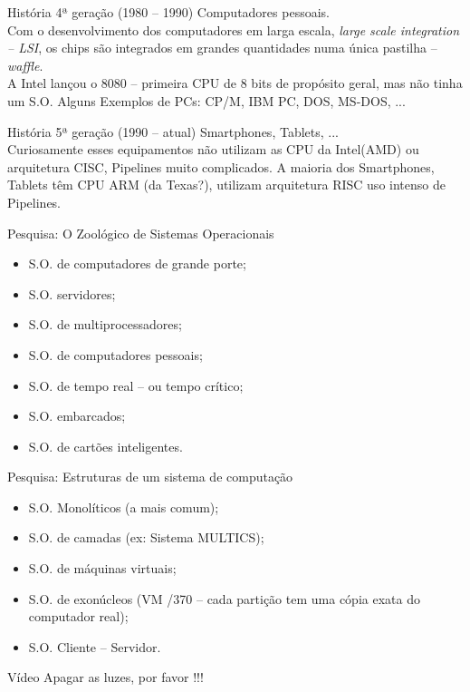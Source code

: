 \documentclass[11pt]{beamer}
\begin{document}

\begin{frame}{História}
  4ª geração (1980 -- 1990) Computadores pessoais.\\
  \vspace{0.2in}
  Com o desenvolvimento dos computadores em larga escala, \textit{large scale integration -- LSI}, os chips são integrados em grandes quantidades
  numa única pastilha -- \textit{waffle}.\\
  A Intel lançou o 8080 -- primeira CPU de 8 bits de propósito geral, mas não tinha um S.O.
  Alguns Exemplos de PCs: CP/M, IBM PC, DOS, MS-DOS, ...
  
\end{frame}



\begin{frame}{História}
  5ª geração (1990 -- atual) Smartphones, Tablets, ...\\
  \vspace{0.2in}
  Curiosamente esses equipamentos não utilizam as CPU da Intel(AMD) ou arquitetura CISC, Pipelines muito complicados.
  A maioria dos Smartphones, Tablets têm CPU ARM (da Texas?), utilizam arquitetura RISC uso intenso de Pipelines.  
  
\end{frame}




\begin{frame}{Pesquisa: O Zoológico de Sistemas Operacionais}
 \begin{itemize}
  \item S.O. de computadores de grande porte;
  \item S.O. servidores;
  \item S.O. de multiprocessadores;
  \item S.O. de computadores pessoais;
  \item S.O. de tempo real -- ou tempo crítico;
  \item S.O. embarcados;
  \item S.O. de cartões inteligentes.
 \end{itemize}
 
\end{frame}


\begin{frame}{Pesquisa: Estruturas de um sistema de computação}
 \begin{itemize}
  \item S.O. Monolíticos (a mais comum);
  \item S.O. de camadas (ex: Sistema MULTICS);
  \item S.O. de máquinas virtuais;
  \item S.O. de exonúcleos (VM /370 -- cada partição tem uma cópia exata do computador real);
  \item S.O. Cliente -- Servidor.
 \end{itemize}
 
\end{frame}



\begin{frame}{Vídeo}
 Apagar as luzes, por favor !!!
\end{frame}
\end{document}
